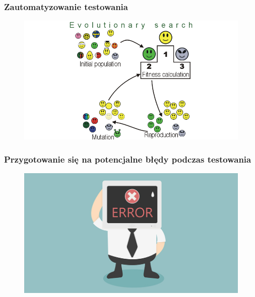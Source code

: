 \begin{frame}
    \frametitle{Zautomatyzowanie testowania}
    \begin{figure}[H]
    \includegraphics[scale=1.8]{img/algorytm_ewolucyjny.png} 
    \end{figure}
\end{frame}

\begin{frame}
    \frametitle{Przygotowanie się na potencjalne błędy podczas testowania}
    \begin{figure}[H]
    \includegraphics[scale=0.3]{img/error.jpg} 
    \end{figure}
\end{frame}

